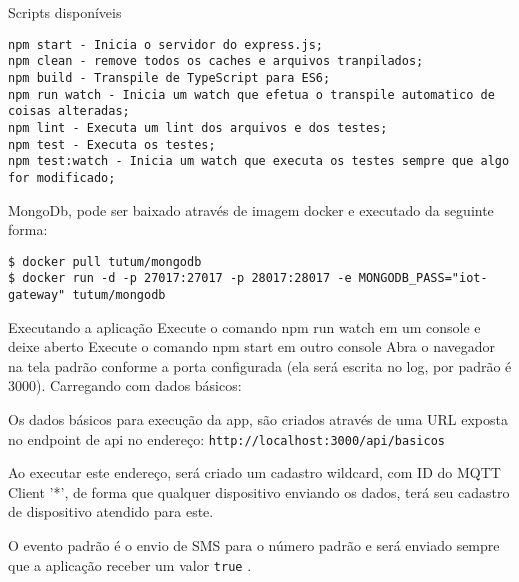 Scripts disponíveis
\begin{verbatim}
npm start - Inicia o servidor do express.js;
npm clean - remove todos os caches e arquivos tranpilados;
npm build - Transpile de TypeScript para ES6;
npm run watch - Inicia um watch que efetua o transpile automatico de coisas alteradas;
npm lint - Executa um lint dos arquivos e dos testes;
npm test - Executa os testes;
npm test:watch - Inicia um watch que executa os testes sempre que algo for modificado;
\end{verbatim}

MongoDb, pode ser baixado através de imagem docker e executado da seguinte forma:
\begin{verbatim}
$ docker pull tutum/mongodb
$ docker run -d -p 27017:27017 -p 28017:28017 -e MONGODB_PASS="iot-gateway" tutum/mongodb
\end{verbatim}

Executando a aplicação
Execute o comando npm run watch em um console e deixe aberto
Execute o comando npm start em outro console
Abra o navegador na tela padrão conforme a porta configurada (ela será escrita no log, por padrão é 3000).
Carregando com dados básicos:

Os dados básicos para execução da app, são criados através de uma URL exposta no endpoint de api no endereço: \verb|http://localhost:3000/api/basicos|

Ao executar este endereço, será criado um cadastro wildcard, com ID do MQTT Client '*', de forma que qualquer dispositivo enviando os dados, terá seu cadastro de dispositivo atendido para este.

O evento padrão é o envio de SMS para o número padrão e será enviado sempre que a aplicação receber um valor \verb|true|	.